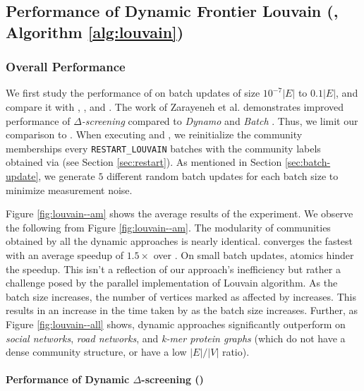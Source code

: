 





\subsection{Performance of Dynamic Frontier Louvain (\FroLou{}, Algorithm \ref{alg:louvain})}
\label{sec:louvain-evaluation}

\subsubsection{Overall Performance}

We first study the performance of \FroLou{} on batch updates of size $10^{-7} |E|$ to $0.1 |E|$, and compare it with \StaLou{}, \NaiLou{}, and \DelLou{}. The work of Zarayeneh et al. \cite{com-zarayeneh21} demonstrates improved performance of \textit{$\Delta$-screening} compared to \textit{Dynamo} \cite{com-zhuang19} and \textit{Batch} \cite{com-chong13}. Thus, we limit our comparison to \Del{}. When executing \FroLou{} and \DelLou{}, we reinitialize the community memberships every \verb|RESTART_LOUVAIN| batches with the community labels obtained via \StaLou{} (see Section \ref{sec:restart}). As mentioned in Section \ref{sec:batch-update}, we generate $5$ different random batch updates for each batch size to minimize measurement noise.

Figure \ref{fig:louvain--am} shows the average results of the experiment. We observe the following from Figure \ref{fig:louvain--am}. The modularity of communities obtained by all the dynamic approaches is nearly identical. \FroLou{} converges the fastest with an average speedup of $1.5\times$ over \NaiLou{}. On small batch updates, atomics hinder the speedup. This isn't a reflection of our approach's inefficiency but rather a challenge posed by the parallel implementation of Louvain algorithm. As the batch size increases, the number of vertices marked as affected by \FroLou{} increases. This results in an increase in the time taken by \FroLou{} as the batch size increases. Further, as Figure \ref{fig:louvain--all} shows, dynamic approaches significantly outperform \StaLou{} on \textit{social networks}, \textit{road networks}, and \textit{k-mer protein graphs} (which do not have a dense community structure, or have a low $|E|/|V|$ ratio).

\paragraph{Performance of Dynamic $\Delta$-screening (\DelLou{})}

